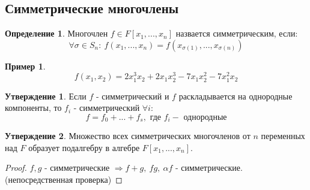 \documentclass[a4paper, 12pt]{article}
\theoremstyle{definition}
\newtheorem*{definition}{Определение}
\newtheorem*{subtheorem}{Утверждение}
\newtheorem*{example1}{Пример}
\begin{document}
  \subsection{Симметрические многочлены}
  \begin{definition}
    Многочлен $f \in F[x_1,...,x_n]$ назвается симметрическим, если:
    $$\forall \sigma \in S_n: \ f(x_1,...,x_n) = f(x_{\sigma (1)},...,x_{\sigma(n)})$$  
  \end{definition}
  \begin{example1}
    $$f(x_1,x_2) = 2x_1^3x_2 + 2x_1x_2^3 - 7x_1x_2^2 - 7x_1^2x_2$$ 
  \end{example1}
  \begin{subtheorem}
    Если $f$ - симметрический и $f$ раскладывается на однородные компоненты, то $f_i$ - симметрический $\forall i$:
    $$f = f_0+...+f_s, \text{ где } f_i - \text{ однородные}$$     
  \end{subtheorem}
  \begin{subtheorem}
    Множество всех симметрических многочленов от $n$ переменных над $F$ образует подалгебру в алгебре $F[x_1,...,x_n]$.    
  \end{subtheorem}
  \begin{proof}
    $f, g$ - симметрические $\Longrightarrow f+g, \ fg, \ \alpha f$ - симметрические. (непосредственная проверка)
  \end{proof}  
\end{document}
